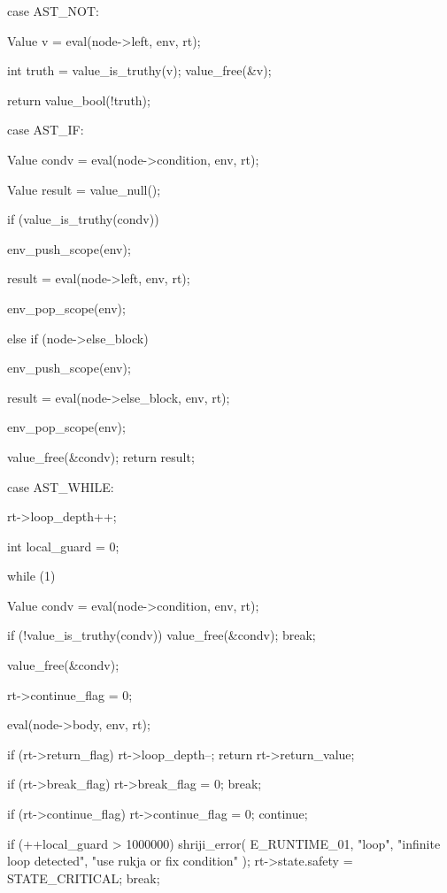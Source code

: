 \documentclass{article}
\begin{document}
{{       case AST_NOT: {
    Value v = eval(node->left, env, rt);

    int truth = value_is_truthy(v);
    value_free(&v);

    return value_bool(!truth);
    }


case AST_IF: {
    Value condv = eval(node->condition, env, rt);

    Value result = value_null();

    if (value_is_truthy(condv)) {

        env_push_scope(env);

        result = eval(node->left, env, rt);

        env_pop_scope(env);
    }
    else if (node->else_block) {

        env_push_scope(env);

        result = eval(node->else_block, env, rt);

        env_pop_scope(env);
    }

    value_free(&condv);
    return result;
}



case AST_WHILE: {

    rt->loop_depth++;

    int local_guard = 0;

    while (1) {

        Value condv = eval(node->condition, env, rt);

        if (!value_is_truthy(condv)) {
            value_free(&condv);
            break;
        }

        value_free(&condv);

        rt->continue_flag = 0;

        eval(node->body, env, rt);

        if (rt->return_flag) {
            rt->loop_depth--;
            return rt->return_value;
        }

        if (rt->break_flag) {
            rt->break_flag = 0;
            break;
        }

        if (rt->continue_flag) {
            rt->continue_flag = 0;
            continue;
        }

        if (++local_guard > 1000000) {
            shriji_error(
                E_RUNTIME_01,
                "loop",
                "infinite loop detected",
                "use rukja or fix condition"
            );
            rt->state.safety = STATE_CRITICAL;
            break;
        }
    }

}}}
\end{document}
